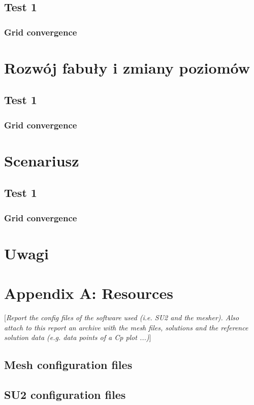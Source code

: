 \documentclass[11pt,polish, openany]{book}
\begin{document}
\section{Test 1}
\subsection{Grid convergence}

\chapter{Rozwój fabuły i zmiany poziomów}\label{chapt:results}
\section{Test 1}
\subsection{Grid convergence}

\chapter{Scenariusz}\label{chapt:results}
\section{Test 1}
\subsection{Grid convergence}
\chapter{Uwagi}

\pagebreak





\pagebreak

\chapter*{Appendix A: Resources}
[\textit{Report the config files of the software used (i.e. SU2 \cite{economon2015su2} and the mesher). Also attach to this report an archive with the mesh files, solutions and the reference solution data (e.g. data points of a Cp plot ...)}]
\section*{Mesh configuration files}
\section*{SU2 configuration files}
\end{document}
